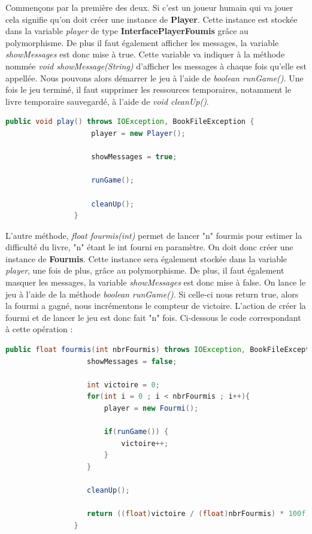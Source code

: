 			Commençons par la première des deux. Si c'est un joueur humain qui va jouer cela signifie qu'on doit créer une instance de \textbf{Player}. Cette instance est stockée dans la variable \textit{player} de type \textbf{InterfacePlayerFoumis} grâce au polymorphisme. De plus il faut également afficher les messages, la variable \textit{showMessages} est donc mise à true. Cette variable va indiquer à la méthode nommée \textit{void showMessage(String)} d'afficher les messages à chaque fois qu'elle est appellée. Nous pouvons alors démarrer le jeu à l'aide de \textit{boolean runGame()}. Une fois le jeu terminé, il faut supprimer les ressources temporaires, notamment le livre temporaire sauvegardé, à l'aide de \textit{void cleanUp()}.

			\begin{lstlisting}[gobble=16, language=java, caption=play()]
				public void play() throws IOException, BookFileException {
					player = new Player();

					showMessages = true;

					runGame();

					cleanUp();
				}
			\end{lstlisting}

			L'autre méthode, \textit{float fourmis(int)} permet de lancer "n" fourmis pour estimer la difficulté du livre, "n" étant le int fourni en paramètre. On doit donc créer une instance de \textbf{Fourmis}. Cette instance sera également stockée dans la variable \textit{player}, une fois de plus, grâce au polymorphisme. De plus, il faut également masquer les messages, la variable \textit{showMessages} est donc mise à false. On lance le jeu à l'aide de la méthode \textit{boolean runGame()}. Si celle-ci nous return true, alors la fourmi a gagné, nous incrémentons le compteur de victoire. L'action de créer la fourmi et de lancer le jeu est donc fait "n" fois. Ci-dessous le code correspondant à cette opération :

			\begin{lstlisting}[gobble=16, language=java, caption=fourmis()]
				public float fourmis(int nbrFourmis) throws IOException, BookFileException {
				   showMessages = false;

				   int victoire = 0;
				   for(int i = 0 ; i < nbrFourmis ; i++){
					   player = new Fourmi();

					   if(runGame()) {
						   victoire++;
					   }
				   }

				   cleanUp();

				   return ((float)victoire / (float)nbrFourmis) * 100f;
				}
			\end{lstlisting}

